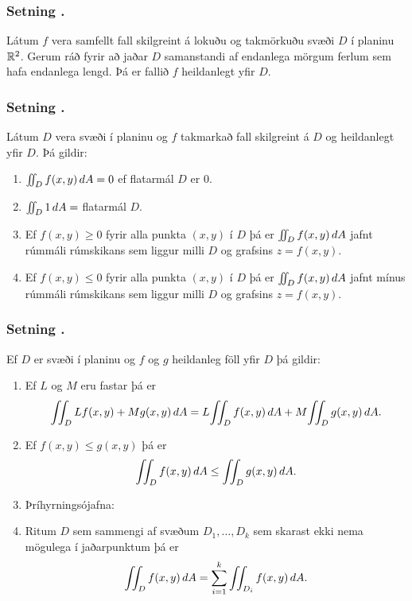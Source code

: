 \subsubsection{Setning \kaflanr.}
Látum $f$ vera samfellt fall skilgreint á
lokuðu og takmörkuðu svæði $D$ í planinu ${\mathbb R}^2$.  Gerum ráð fyrir að
jaðar $D$ samanstandi af endanlega mörgum ferlum sem hafa endanlega
lengd.  Þá er fallið $f$ heildanlegt yfir $D$.



\subsubsection{Setning \kaflanr.}
Látum $D$ vera svæði í planinu og $f$ takmarkað
fall skilgreint á $D$ og heildanlegt yfir $D$.  Þá gildir:

\begin {enumerate}
 \item $\int\!\!\!\int_D f(x,y)\,dA=0$ ef flatarmál $D$ er 0.
 \item $\int\!\!\!\int_D 1\,dA=$ flatarmál $D$.
 \item Ef $f(x,y)\geq 0$ fyrir alla punkta $(x,y)$ í $D$ þá er 
$\int\!\!\!\int_D f(x,y)\,dA$ jafnt rúmmáli rúmskikans sem liggur milli $D$ og
grafsins $z=f(x,y)$.
\item Ef $f(x,y)\leq 0$ fyrir alla punkta $(x,y)$ í $D$ þá er 
$\int\!\!\!\int_D f(x,y)\,dA$ jafnt mínus rúmmáli rúmskikans sem liggur milli $D$ og
grafsins $z=f(x,y)$.
\end {enumerate}




\subsubsection{Setning \kaflanr.}
Ef $D$ er svæði í planinu og $f$ og $g$
heildanleg föll yfir $D$ þá gildir:

\begin {enumerate}
 \item  Ef $L$ og $M$ eru fastar þá er
$$\tvint_D Lf(x,y)+Mg(x,y)\,dA=L\!\tvint_D f(x,y)\,dA+M\!\tvint_D
g(x,y)\,dA.$$
\item  Ef $f(x,y)\leq g(x,y)$ þá er 
$$\int\!\!\!\int_D f(x,y)\,dA\leq \int\!\!\!\int_Dg(x,y)\,dA.$$

\item  Þríhyrningsójafna: 

\item  Ritum $D$ sem sammengi af svæðum $D_1,\ldots, D_k$ sem skarast
ekki nema mögulega í jaðarpunktum þá er
$$\int\!\!\!\int_D f(x,y)\,dA=\sum_{i=1}^k\int\!\!\!\int_{D_i}f(x,y)\,dA.$$
\end {enumerate}




